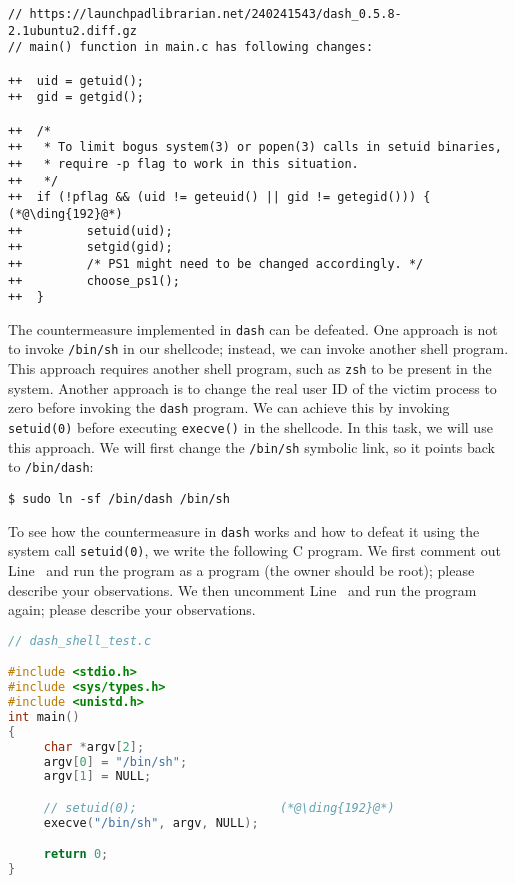 \begin{lstlisting}
// https://launchpadlibrarian.net/240241543/dash_0.5.8-2.1ubuntu2.diff.gz
// main() function in main.c has following changes:

++	uid = getuid();
++	gid = getgid();

++	/*
++	 * To limit bogus system(3) or popen(3) calls in setuid binaries, 
++ 	 * require -p flag to work in this situation.
++	 */
++	if (!pflag && (uid != geteuid() || gid != getegid())) {  (*@\ding{192}@*)
++         setuid(uid);
++         setgid(gid);
++         /* PS1 might need to be changed accordingly. */
++         choose_ps1();
++	}
\end{lstlisting}



The countermeasure implemented in \texttt{dash} can be defeated. One approach
is not to invoke \texttt{/bin/sh} in our shellcode; instead, we can
invoke another shell program. This approach requires another shell program, such as 
\texttt{zsh} to be present in the system. Another approach is to 
change the real user ID of the victim process to zero before 
invoking the \texttt{dash} program.   
We can achieve this by invoking \texttt{setuid(0)} before executing 
\texttt{execve()} in the shellcode. In this task, we will
use this approach. We will first change the \texttt{/bin/sh} symbolic link, so 
it points back to 
\texttt{/bin/dash}:


\begin{lstlisting}
$ sudo ln -sf /bin/dash /bin/sh
\end{lstlisting}


To see how the countermeasure in \texttt{dash} works and how to 
defeat it using the system call \texttt{setuid(0)}, we write the following C program. 
We first comment out Line~ and run the program as a \setuid program (the owner should
be root); please describe your observations. We then uncomment Line~ and 
run the program again; please describe your observations.


\begin{lstlisting}[language=C]
// dash_shell_test.c

#include <stdio.h>
#include <sys/types.h>
#include <unistd.h>
int main()
{
     char *argv[2];
     argv[0] = "/bin/sh";
     argv[1] = NULL;

     // setuid(0);                    (*@\ding{192}@*)
     execve("/bin/sh", argv, NULL);   

     return 0;
}
\end{lstlisting}



